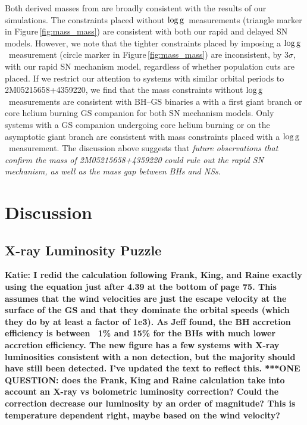 \documentclass[twocolumn,tighten]{aastex61}
\newcommand{\logg}{$\rm{log\,g}$}
\newcommand{\katie}[1]{\textbf{\color{purple} Katie: #1}}
\begin{document}
Both derived masses from \citet{Thompson2018} are broadly consistent with the results of our simulations. The constraints placed without \logg\ measurements (triangle marker in Figure\,\ref{fig:mass_mass}) are consistent with both our rapid and delayed SN models. However, we note that the tighter constraints placed by imposing a \logg\ measurement (circle marker in Figure\,\ref{fig:mass_mass}) are inconsistent, by $3\sigma$, with our rapid SN mechanism model, regardless of whether population cuts are placed. If we restrict our attention to systems with similar orbital periods to 2M05215658+4359220, we find that the mass constraints without \logg\ measurements are consistent with BH--GS binaries a with a first giant branch or core helium burning GS companion for both SN mechanism models. Only systems with a GS companion undergoing core helium burning or on the asymptotic giant branch are consistent with mass constraints placed with a \logg\ measurement. The discussion above suggests that \emph{future observations that confirm the mass of 2M05215658+4359220 could rule out the rapid SN mechanism, as well as the mass gap between BHs and NSs}.




\section{Discussion}
\label{S:discussion}
%
\subsection{X-ray Luminosity Puzzle}
\label{SubS:X_rays}
\katie{I redid the calculation following Frank, King, and Raine exactly using the equation just after 4.39 at the bottom of page 75. This assumes that the wind velocities are just the escape velocity at the surface of the GS and that they dominate the orbital speeds (which they do by at least a factor of 1e3). As Jeff found, the BH accretion efficiency is between ~1\% and 15\% for the BHs with much lower accretion efficiency. The new figure has a few systems with X-ray luminosities consistent with a non detection, but the majority should have still been detected. I've updated the text to reflect this. ***ONE QUESTION: does the Frank, King and Raine calculation take into account an X-ray vs bolometric luminosity correction? Could the correction decrease our luminosity by an order of magnitude? This is temperature dependent right, maybe based on the wind velocity?}
\end{document}
